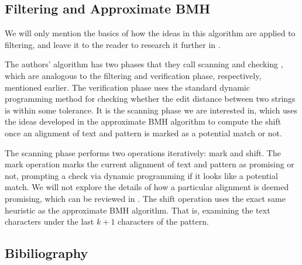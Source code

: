 \documentclass[10pt]{article}
\begin{document}
\subsection*{Filtering and Approximate BMH}

We will only mention the basics of how the ideas in this algorithm are applied to filtering, and leave it to the reader
to research it further in \cite{taruk93}.

The authors' algorithm has two phases that they call scanning and checking \cite{taruk93}, which are analogous to the
filtering and verification phase, respectively, mentioned earlier. The verification phase uses the standard dynamic
programming method for checking whether the edit distance between two strings is within some tolerance. It is the
scanning phase we are interested in, which uses the ideas developed in the approximate BMH algorithm to compute the
shift once an alignment of text and pattern is marked as a potential match or not.

The scanning phase performs two operations iteratively: mark and shift. The mark operation marks the current alignment
of text and pattern as promising or not, prompting a check via dynamic programming if it looks like a potential match.
We will not explore the details of how a particular alignment is deemed promising, which can be reviewed in \cite{taruk93}.
The shift operation uses the exact same heuristic as the approximate BMH algorithm. That is, examining the text
characters under the last $k+1$ characters of the pattern.


\subsection*{Bibiliography}
\end{document}
